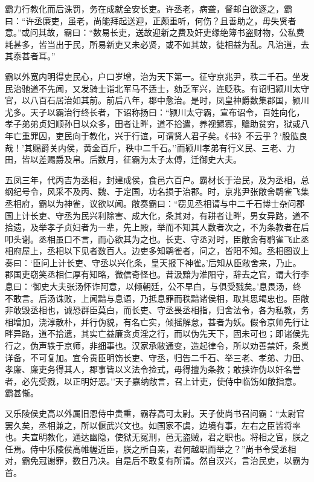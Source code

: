 \documentclass[]{article}
\begin{document}
霸力行教化而后诛罚，务在成就全安长吏。许丞老，病聋，督邮白欲逐之，霸曰：``许丞廉吏，虽老，尚能拜起送迎，正颇重听，何伤？且善助之，毋失贤者意。''或问其故，霸曰：``数易长吏，送故迎新之费及奸吏缘绝簿书盗财物，公私费耗甚多，皆当出于民，所易新吏又未必贤，或不如其故，徒相益为乱。凡治道，去其泰甚者耳。''

霸以外宽内明得吏民心，户口岁增，治为天下第一。征守京兆尹，秩二千石。坐发民治驰道不先闻，又发骑士诣北军马不适士，劾乏军兴，连贬秩。有诏归颍川太守官，以八百石居治如其前。前后八年，郡中愈治。是时，凤皇神爵数集郡国，颍川尤多。天子以霸治行终长者，下诏称扬曰：``颍川太守霸，宣布诏令，百姓向化，孝子弟弟贞妇顺孙日以众多，田者让畔，道不拾遣，养视鳏寡，赡助贫穷，狱或八年亡重罪囚，吏民向于教化，兴于行谊，可谓贤人君子矣。《书》不云乎？`股肱良哉！'其赐爵关内侯，黄金百斤，秩中二千石。''而颍川孝弟有行义民、三老、力田，皆以差赐爵及帛。后数月，征霸为太子太傅，迁御史大夫。

五凤三年，代丙吉为丞相，封建成侯，食邑六百户。霸材长于治民，及为丞相，总纲纪号令，风采不及丙、魏、于定国，功名损于治郡。时，京兆尹张敞舍鹖雀飞集丞相府，霸以为神雀，议欲以闻。敞奏霸曰：``窃见丞相请与中二千石博士杂问郡国上计长吏、守丞为民兴利除害、成大化，条其对，有耕者让畔，男女异路，道不拾遗，及举孝子贞妇者为一辈，先上殿，举而不知其人数者次之，不为条教者在后叩头谢。丞相虽口不言，而心欲其为之也。长吏、守丞对时，臣敞舍有鹖雀飞止丞相府屋上，丞相以下见者数百人。边吏多知鹖雀者，问之，皆阳不知。丞相图议上奏曰：`臣问上计长吏、守丞以兴化条，皇天报下神雀。'后知从臣敞舍来，乃止。郡国吏窃笑丞相仁厚有知略，微信奇怪也。昔汲黯为淮阳守，辞去之官，谓大行李息曰：`御史大夫张汤怀诈阿意，以倾朝廷，公不早白，与俱受戮矣。'息畏汤，终不敢言。后汤诛败，上闻黯与息语，乃抵息罪而秩黯诸侯相，取其思竭忠也。臣敞非敢毁丞相也，诚恐群臣莫白，而长吏、守丞畏丞相指，归舍法令，各为私教，务相增加，浇淳散朴，并行伪貌，有名亡实，倾摇解怠，甚者为妖。假令京师先行让畔异路，道不拾遗，其实亡益廉贪贞淫之行，而以伪先天下，固未可也；即诸侯先行之，伪声轶于京师，非细事也。汉家承敝通变，造起律令，所以劝善禁奸，条贯详备，不可复加。宜令贵臣明饬长吏、守丞，归告二千石、举三老、孝弟、力田、孝廉、廉吏务得其人，郡事皆以义法令捡式，毋得擅为条教；敢挟诈伪以奸名誉者，必先受戮，以正明好恶。''天子嘉纳敞言，召上计吏，使侍中临饬如敞指意。霸甚惭。

又乐陵侯史高以外属旧恩侍中贵重，霸荐高可太尉。天子使尚书召问霸：``太尉官罢久矣，丞相兼之，所以偃武兴文也。如国家不虞，边境有事，左右之臣皆将率也。夫宣明教化，通达幽隐，使狱无冤刑，邑无盗贼，君之职也。将相之官，朕之任焉。侍中乐陵侯高帷幄近臣，朕之所自亲，君何越职而举之？''尚书令受丞相对，霸免冠谢罪，数日乃决。自是后不敢复有所请。然自汉兴，言治民吏，以霸为首。
\end{document}
